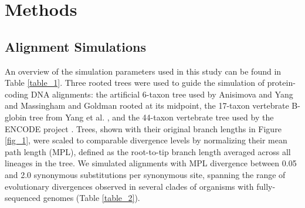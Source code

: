 \documentclass{article}
\begin{document}
\section*{Methods}



\subsection*{Alignment Simulations}

An overview of the simulation parameters used in this study can be
found in Table \ref{table_1}. Three rooted trees were used to guide
the simulation of protein-coding DNA alignments: the artificial
6-taxon tree used by Anisimova and Yang
\citeyearpar{Anisimova2001Accuracy} and Massingham and Goldman
\citeyearpar{Massingham2005Detecting} rooted at its midpoint, the
17-taxon vertebrate B-globin tree from Yang et
al. \citeyearpar{Yang2000CodonSubstitution}, and the 44-taxon
vertebrate tree used by the ENCODE project
\citep{2007Identification,Nikolaev2007Early}. Trees, shown with their
original branch lengths in Figure \ref{fig_1}, were scaled to
comparable divergence levels by normalizing their mean path length
(MPL), defined as the root-to-tip branch length averaged across all
lineages in the tree. We simulated alignments with MPL divergence
between 0.05 and 2.0 synonymous substitutions per synonymous site,
spanning the range of evolutionary divergences observed in several
clades of organisms with fully-sequenced genomes (Table
\ref{table_2}).
\end{document}

